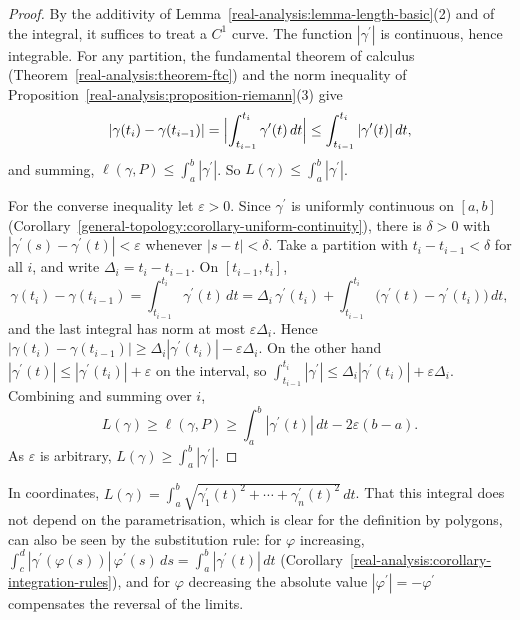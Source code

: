 \begin{proof}
By the additivity of Lemma~\ref{real-analysis:lemma-length-basic}(2) and of the integral, it suffices to treat a $C^1$ curve. The function $|\gamma^{\prime}|$ is continuous, hence integrable. For any partition, the
fundamental theorem of calculus (Theorem~\ref{real-analysis:theorem-ftc}) and the norm inequality of Proposition~\ref{real-analysis:proposition-riemann}(3) give
\[
|\gamma(t_i) - \gamma(t_{i-1})| = \Bigl|\int_{t_{i-1}}^{t_i}\gamma^{\prime}(t)\,dt\Bigr| \leq \int_{t_{i-1}}^{t_i}|\gamma^{\prime}(t)|\,dt,
\]
and summing, $\ell(\gamma, P) \leq \int_a^b|\gamma^{\prime}|$. So $L(\gamma) \leq \int_a^b|\gamma^{\prime}|$.

For the converse inequality let $\varepsilon > 0$. Since $\gamma^{\prime}$ is uniformly continuous on $[a, b]$ (Corollary~\ref{general-topology:corollary-uniform-continuity}), there is $\delta > 0$ with
$|\gamma^{\prime}(s) - \gamma^{\prime}(t)| < \varepsilon$ whenever $|s - t| < \delta$. Take a partition with $t_i - t_{i-1} < \delta$ for all $i$, and write $\Delta_i = t_i - t_{i-1}$. On $[t_{i-1}, t_i]$,
\[
\gamma(t_i) - \gamma(t_{i-1}) = \int_{t_{i-1}}^{t_i}\gamma^{\prime}(t)\,dt = \Delta_i\,\gamma^{\prime}(t_i) + \int_{t_{i-1}}^{t_i}\bigl(\gamma^{\prime}(t) - \gamma^{\prime}(t_i)\bigr)\,dt,
\]
and the last integral has norm at most $\varepsilon\Delta_i$. Hence $|\gamma(t_i) - \gamma(t_{i-1})| \geq \Delta_i|\gamma^{\prime}(t_i)| - \varepsilon\Delta_i$. On the other hand $|\gamma^{\prime}(t)| \leq |\gamma^{\prime}(t_i)| + \varepsilon$
on the interval, so $\int_{t_{i-1}}^{t_i}|\gamma^{\prime}| \leq \Delta_i|\gamma^{\prime}(t_i)| + \varepsilon\Delta_i$. Combining and summing over $i$,
\[
L(\gamma) \geq \ell(\gamma, P) \geq \int_a^b|\gamma^{\prime}(t)|\,dt - 2\varepsilon(b - a).
\]
As $\varepsilon$ is arbitrary, $L(\gamma) \geq \int_a^b|\gamma^{\prime}|$.
\end{proof}

In coordinates, $L(\gamma) = \int_a^b\sqrt{\gamma_1^{\prime}(t)^2 + \cdots + \gamma_n^{\prime}(t)^2}\,dt$. That this integral does not depend on the parametrisation, which is clear for the definition by polygons, can
also be seen by the substitution rule: for $\varphi$ increasing, $\int_c^d|\gamma^{\prime}(\varphi(s))|\,\varphi^{\prime}(s)\,ds = \int_a^b|\gamma^{\prime}(t)|\,dt$ (Corollary~\ref{real-analysis:corollary-integration-rules}), and for
$\varphi$ decreasing the absolute value $|\varphi^{\prime}| = -\varphi^{\prime}$ compensates the reversal of the limits.

